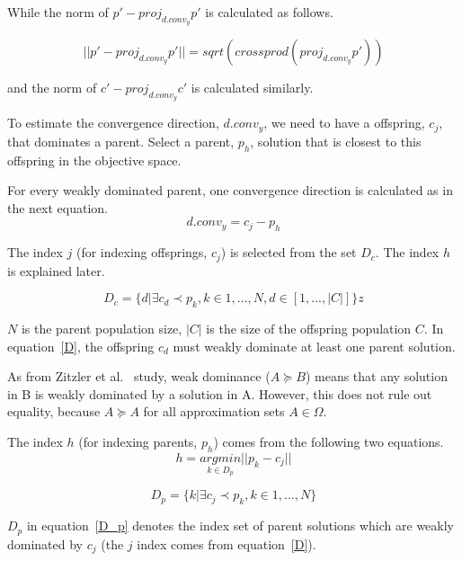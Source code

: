 While the norm of $p \prime - proj_{d.conv_{y}}p \prime$ is calculated as follows.


\begin{equation}
||p \prime - proj_{d.conv_{y}}p \prime|| = sqrt(crossprod(proj_{d.conv_{y}}p \prime))
\end{equation}

and the norm of $c \prime - proj_{d.conv_{y}}c \prime$ is calculated similarly.


To estimate the convergence direction, $d.conv_{y}$, we need to have a offspring, $c_j$, that dominates a parent. Select a parent, $p_h$, solution that is closest to this offspring in the objective space. 

For every weakly dominated parent, one convergence direction is calculated as in the next equation.
\begin{equation}
\label{1}
	d.conv_{y} = c_j - p_h
\end{equation}

The index $j$ (for indexing offsprings, $c_j$) is selected from the set $D_c$. The index $h$ is explained later.

\begin{equation}
\label{D}
	D_c = \{d| \exists c_d \prec p_k, k \in {1,..., N}, d \in [1,..., |C|]\}
z\end{equation}

$N$ is the parent population size, $|C|$ is the size of the offspring population $C$. In equation~\ref{D}, the offspring $c_d$ must weakly dominate at least one parent solution. 

As from Zitzler et al.~\cite{zitzler2003performance} study, weak dominance ($A \succeq B$) means that any solution in B is weakly dominated by a solution in A. However, this does not rule out equality, because $A \succeq A$ for all approximation sets $A \in \Omega$.

The index $h$ (for indexing parents, $p_h$) comes from the following two equations.
\begin{equation}
h = \underset{k \in D_p }{argmin} || p_k - c_j ||
\end{equation}

\begin{equation}
\label{D_p}
D_p = \{k| \exists c_j \prec p_k, k \in {1,..., N}\}
\end{equation}

$D_p$ in equation~\ref{D_p} denotes the index set of parent solutions which are weakly dominated by $c_j$ (the $j$ index comes from equation~\ref{D}).










